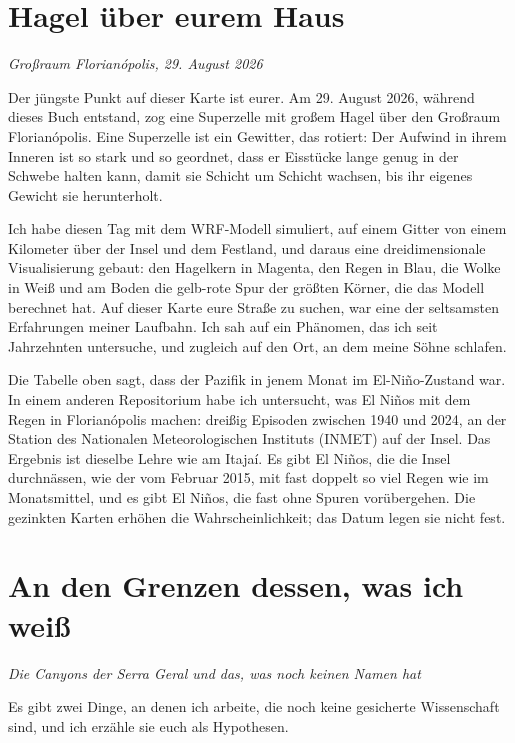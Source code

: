 \documentclass[
  ngerman,
  11pt,
  openany]{book}
\begin{document}
\section{Hagel über eurem Haus}\label{hagel-uxfcber-eurem-haus}

\emph{Großraum Florianópolis, 29. August 2026}

Der jüngste Punkt auf dieser Karte ist eurer. Am 29. August 2026,
während dieses Buch entstand, zog eine Superzelle mit großem Hagel über
den Großraum Florianópolis. Eine Superzelle ist ein Gewitter, das
rotiert: Der Aufwind in ihrem Inneren ist so stark und so geordnet, dass
er Eisstücke lange genug in der Schwebe halten kann, damit sie Schicht
um Schicht wachsen, bis ihr eigenes Gewicht sie herunterholt.

Ich habe diesen Tag mit dem WRF-Modell simuliert, auf einem Gitter von
einem Kilometer über der Insel und dem Festland, und daraus eine
dreidimensionale Visualisierung gebaut: den Hagelkern in Magenta, den
Regen in Blau, die Wolke in Weiß und am Boden die gelb-rote Spur der
größten Körner, die das Modell berechnet hat. Auf dieser Karte eure
Straße zu suchen, war eine der seltsamsten Erfahrungen meiner Laufbahn.
Ich sah auf ein Phänomen, das ich seit Jahrzehnten untersuche, und
zugleich auf den Ort, an dem meine Söhne schlafen.

Die Tabelle oben sagt, dass der Pazifik in jenem Monat im
El-Niño-Zustand war. In einem anderen Repositorium habe ich untersucht,
was El Niños mit dem Regen in Florianópolis machen: dreißig Episoden
zwischen 1940 und 2024, an der Station des Nationalen Meteorologischen
Instituts (INMET) auf der Insel. Das Ergebnis ist dieselbe Lehre wie am
Itajaí. Es gibt El Niños, die die Insel durchnässen, wie der vom Februar
2015, mit fast doppelt so viel Regen wie im Monatsmittel, und es gibt El
Niños, die fast ohne Spuren vorübergehen. Die gezinkten Karten erhöhen
die Wahrscheinlichkeit; das Datum legen sie nicht fest.

\section{An den Grenzen dessen, was ich
weiß}\label{an-den-grenzen-dessen-was-ich-weiuxdf}

\emph{Die Canyons der Serra Geral und das, was noch keinen Namen hat}

Es gibt zwei Dinge, an denen ich arbeite, die noch keine gesicherte
Wissenschaft sind, und ich erzähle sie euch als Hypothesen.
\end{document}
